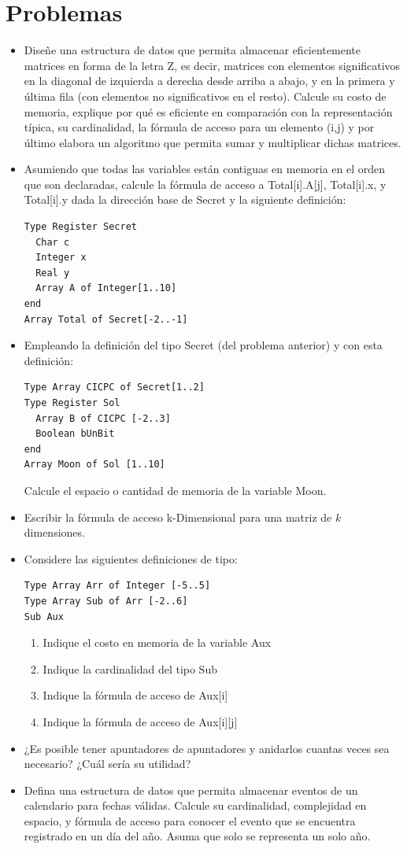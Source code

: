 \section{Problemas}

\begin{itemize}
\item Diseñe una estructura de datos que permita almacenar eficientemente matrices en forma de la letra Z, es decir, matrices con elementos significativos en la diagonal de izquierda a derecha desde arriba a abajo, y en la primera y última fila (con elementos no significativos en el resto). Calcule su costo de memoria, explique por qué es eficiente en comparación con la representación típica, su cardinalidad, la fórmula de acceso para un elemento (i,j) y por último elabora un algoritmo que permita sumar y multiplicar dichas matrices.
\item Asumiendo que todas las variables están contiguas en memoria en el orden que son declaradas, calcule la fórmula de acceso a Total[i].A[j], Total[i].x, y Total[i].y dada la dirección base de Secret y la siguiente definición:
\begin{lstlisting}[upquote=true, language=pseudo]
Type Register Secret
  Char c
  Integer x
  Real y
  Array A of Integer[1..10]
end
Array Total of Secret[-2..-1]
\end{lstlisting}
\item Empleando la definición del tipo Secret (del problema anterior) y con esta definición:
\begin{lstlisting}[upquote=true, language=pseudo]
Type Array CICPC of Secret[1..2]
Type Register Sol
  Array B of CICPC [-2..3]
  Boolean bUnBit
end
Array Moon of Sol [1..10]
\end{lstlisting}
Calcule el espacio o cantidad de memoria de la variable Moon.
\item Escribir la fórmula de acceso k-Dimensional para una matriz de $k$ dimensiones.
\item Considere las siguientes definiciones de tipo:
\begin{lstlisting}[upquote=true, language=pseudo]
Type Array Arr of Integer [-5..5]
Type Array Sub of Arr [-2..6]
Sub Aux
\end{lstlisting}
\begin{enumerate}
\item Indique el costo en memoria de la variable Aux
\item Indique la cardinalidad del tipo Sub
\item Indique la fórmula de acceso de Aux[i]
\item Indique la fórmula de acceso de Aux[i][j]
\end{enumerate}
\item ¿Es posible tener apuntadores de apuntadores y anidarlos cuantas veces sea necesario? ¿Cuál sería su utilidad?
\item Defina una estructura de datos que permita almacenar eventos de un calendario para fechas válidas. Calcule su cardinalidad, complejidad en espacio, y fórmula de acceso para conocer el evento que se encuentra registrado en un día del año. Asuma que solo se representa un solo año.
\end{itemize}




